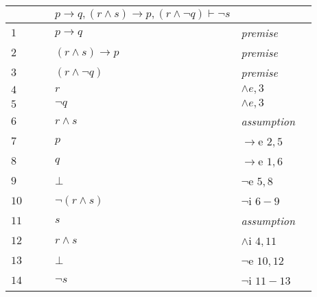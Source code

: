 \documentclass[12pt]{article}
\begin{document}
\begin{table}[H]
	\centering

	\begin{tabular}{*6{l}}
        $ $ & & & $ p \rightarrow q,(r \wedge s) \rightarrow p,(r \wedge \neg q) \vdash \neg s  $ & &\\
        \hline
        \hline

		$1$ & & & $ p \rightarrow q $ & \textit{premise} & \\

		$2$ & & & $(r \wedge s) \rightarrow p $ &\textit{premise} &\\

		$3$ & & & $(r \wedge \neg q) $ &\textit{premise} &\\

		$4$ & & & $ r $ &\textit{$\wedge e,3$} &\\

		$5$ & & & $ \neg q $ &\textit{$\wedge e,3$} &\\ \cline{2-6}

		$6$ &\multicolumn{1}{|c}{}& & $r \wedge s$ & {\textit{assumption}} & \multicolumn{1}{c|}{}\\

		$7$ &\multicolumn{1}{|c}{} & & $p $ & $\rightarrow$e $2,5$ & \multicolumn{1}{c|}{}\\

		$8$ &\multicolumn{1}{|c}{} & & $q $ & $\rightarrow$e $1,6$ & \multicolumn{1}{c|}{}\\

		$9$ &\multicolumn{1}{|c}{}& & $ \bot$ & {$\neg$e $5,8$}&\multicolumn{1}{c|}{}\\\cline{2-6}

		$10$ & & & $\neg(r\wedge s)$ & {$\neg$i $6-9$}& \\ \cline{2-6}

		$11$ &\multicolumn{1}{|c}{}& &$s$ & {\textit{assumption}} &\multicolumn{1}{c|}{}\\

		$12$ &\multicolumn{1}{|c}{}& & $r\wedge s$ & $\wedge$i $4,11$ & \multicolumn{1}{c|}{}\\

		$13$ &\multicolumn{1}{|c}{} & & $\bot$ & {$\neg$e $10,12$} & \multicolumn{1}{c|}{}\\ \cline{2-6}

		$14$ & & & $\neg s$ & {$\neg$i $11-13$} & \\

	\end{tabular}
\end{table}
\end{document}
